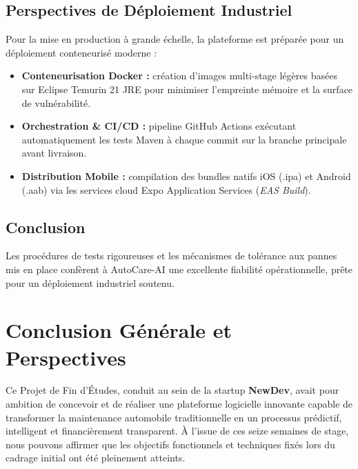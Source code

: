\documentclass[12pt,a4paper,twoside,openright]{report}
\newcommand{\itembullet}{\textcolor{secondaryBlue}{$\blacktriangleright$}}
\begin{document}
  \section{Perspectives de D\'eploiement Industriel}
  Pour la mise en production \`a grande \'echelle, la plateforme est pr\'epar\'ee pour un d\'eploiement conteneuris\'e moderne :
  \begin{itemize}[label=\itembullet]
    \item \textbf{Conteneurisation Docker :} cr\'eation d'images multi-stage l\'eg\`eres bas\'ees sur Eclipse Temurin 21 JRE pour minimiser l'empreinte m\'emoire et la surface de vuln\'erabilit\'e.
    \item \textbf{Orchestration \& CI/CD :} pipeline GitHub Actions ex\'ecutant automatiquement les tests Maven \`a chaque commit sur la branche principale avant livraison.
    \item \textbf{Distribution Mobile :} compilation des bundles natifs iOS (.ipa) et Android (.aab) via les services cloud Expo Application Services (\textit{EAS Build}).
  \end{itemize}

  \section{Conclusion}
  Les proc\'edures de tests rigoureuses et les m\'ecanismes de tol\'erance aux pannes mis en place conf\`erent \`a AutoCare-AI une excellente fiabilit\'e op\'erationnelle, pr\^ete pour un d\'eploiement industriel soutenu.

  \newpage

  \chapter*{Conclusion G\'en\'erale et Perspectives}

  Ce Projet de Fin d'\'Etudes, conduit au sein de la startup \textbf{NewDev}, avait pour ambition de concevoir et de r\'ealiser une plateforme logicielle innovante capable de transformer la maintenance automobile traditionnelle en un processus pr\'edictif, intelligent et financi\`erement transparent. \`A l'issue de ces seize semaines de stage, nous pouvons affirmer que les objectifs fonctionnels et techniques fix\'es lors du cadrage initial ont \'et\'e pleinement atteints.
\end{document}
